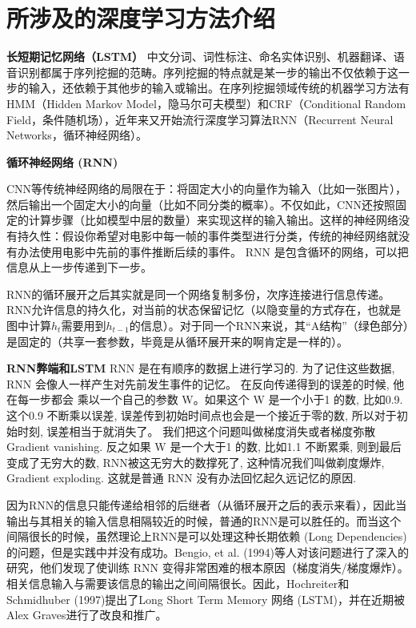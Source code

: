 \section{所涉及的深度学习方法介绍}
\textbf{长短期记忆网络（LSTM）}
中文分词、词性标注、命名实体识别、机器翻译、语音识别都属于序列挖掘的范畴。序列挖掘的特点就是某一步的输出不仅依赖于这一步的输入，还依赖于其他步的输入或输出。在序列挖掘领域传统的机器学习方法有HMM（Hidden Markov Model，隐马尔可夫模型）和CRF（Conditional Random Field，条件随机场），近年来又开始流行深度学习算法RNN（Recurrent Neural Networks，循环神经网络）。

\textbf{循环神经网络 (RNN)}

CNN等传统神经网络的局限在于：将固定大小的向量作为输入（比如一张图片），然后输出一个固定大小的向量（比如不同分类的概率）。不仅如此，CNN还按照固定的计算步骤（比如模型中层的数量）来实现这样的输入输出。这样的神经网络没有持久性：假设你希望对电影中每一帧的事件类型进行分类，传统的神经网络就没有办法使用电影中先前的事件推断后续的事件。
RNN 是包含循环的网络，可以把信息从上一步传递到下一步。

RNN的循环展开之后其实就是同一个网络复制多份，次序连接进行信息传递。RNN允许信息的持久化，对当前的状态保留记忆（以隐变量的方式存在，也就是图中计算$h_{t}$需要用到$h_{t-1}$的信息）。对于同一个RNN来说，其“A结构”（绿色部分）是固定的（共享一套参数，毕竟是从循环展开来的啊肯定是一样的）。

\textbf{RNN弊端和LSTM}
RNN 是在有顺序的数据上进行学习的. 为了记住这些数据, RNN 会像人一样产生对先前发生事件的记忆。 在反向传递得到的误差的时候, 他在每一步都会 乘以一个自己的参数 W。如果这个 W 是一个小于1 的数, 比如0.9. 这个0.9 不断乘以误差, 误差传到初始时间点也会是一个接近于零的数, 所以对于初始时刻, 误差相当于就消失了。 我们把这个问题叫做梯度消失或者梯度弥散 Gradient vanishing. 反之如果 W 是一个大于1 的数, 比如1.1 不断累乘, 则到最后变成了无穷大的数, RNN被这无穷大的数撑死了, 这种情况我们叫做剃度爆炸, Gradient exploding. 这就是普通 RNN 没有办法回忆起久远记忆的原因.

因为RNN的信息只能传递给相邻的后继者（从循环展开之后的表示来看），因此当输出与其相关的输入信息相隔较近的时候，普通的RNN是可以胜任的。而当这个间隔很长的时候，虽然理论上RNN是可以处理这种长期依赖 (Long Dependencies) 的问题，但是实践中并没有成功。Bengio, et al. (1994)等人对该问题进行了深入的研究，他们发现了使训练 RNN 变得非常困难的根本原因（梯度消失/梯度爆炸）。相关信息输入与需要该信息的输出之间间隔很长。因此，Hochreiter和Schmidhuber (1997)提出了Long Short Term Memory 网络 (LSTM)，并在近期被Alex Graves进行了改良和推广。



